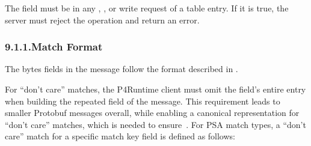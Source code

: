 \documentclass[11pt]{article}
\begin{document}
{%
The  field must be  in any , , or
 write request of a table entry.  If it is true, the server
must reject the operation and return an  error.%

\subsubsection{9.1.1.\hspace*{0.5em}Match Format}\label{sec-match-format}%

\noindent{}The bytes fields in the  message follow the format described in
.%

For \textquotedblleft{}don't care\textquotedblright{} matches, the P4Runtime client must omit the field's entire
 entry when building the  repeated field of the 
message. This requirement leads to smaller Protobuf messages overall, while
enabling a canonical representation for \textquotedblleft{}don't care\textquotedblright{} matches, which is needed
to ensure~. For PSA match types,
a \textquotedblleft{}don't care\textquotedblright{} match for a specific match key field is defined as follows:%

\begin{itemize}%


\end{itemize}}
\end{document}
